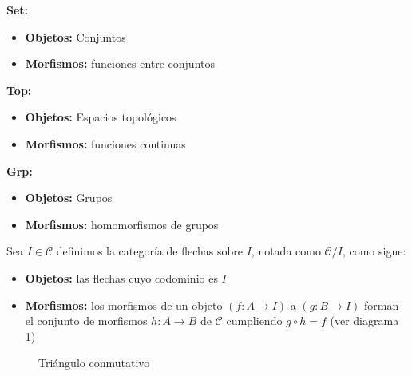 \begin{ejemplo}
    \textbf{Set: } 
    \begin{itemize}
        \item \textbf{Objetos: } Conjuntos
        \item \textbf{Morfismos: } funciones entre conjuntos
    \end{itemize}
\end{ejemplo}

\begin{ejemplo}
    \textbf{Top: } 
    \begin{itemize}
        \item \textbf{Objetos: } Espacios topológicos
        \item \textbf{Morfismos: } funciones continuas
    \end{itemize}
\end{ejemplo}

\begin{ejemplo}
    \textbf{Grp: } 
    \begin{itemize}
        \item \textbf{Objetos: } Grupos
        \item \textbf{Morfismos: } homomorfismos de grupos
    \end{itemize}
\end{ejemplo}

\begin{ejemplo}
    Sea $I \in \mathscr{C}$ definimos la categoría de flechas sobre $I$, notada como $\mathscr{C}/I$, como sigue:
    \begin{itemize}
        \item \textbf{Objetos: } las flechas cuyo codominio es $I$
        \item \textbf{Morfismos: } los morfismos de un objeto $(f: A \longrightarrow I)$ a $(g: B \longrightarrow I)$ forman el conjunto de morfismos $h: A \longrightarrow B$ de $\mathscr{C}$ cumpliendo $g \circ h = f$ (ver diagrama \ref{diag:traingulo_hacia})
    \end{itemize}
\end{ejemplo}

\begin{figure}[htpb]
    \centering
    \caption{Triángulo conmutativo}
    \label{diag:traingulo_hacia}
\end{figure}


